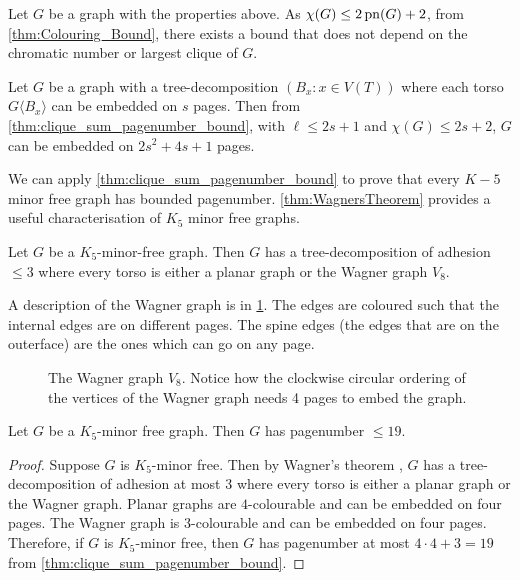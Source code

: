 Let $G$ be a graph with the properties above. As \(\chi(G) \leq 2 \pn(G) + 2\), from \cref{thm:Colouring_Bound}, there exists a bound that does not depend on the chromatic number or largest clique of \(G\).
\begin{corollary}\label{corr:bded_pn_tree_decomp}
	Let \(G\) be a graph with a tree-decomposition \((B_x: x \in V(T))\) where each torso \(G \langle B_x \rangle\) can be embedded on $s$ pages. Then from \cref{thm:clique_sum_pagenumber_bound}, with $\ell \leq 2s + 1$ and $\chi(G) \leq 2 s + 2$, \(G\) can be embedded on \(2s^2 + 4s + 1\) pages.
\end{corollary}

We can apply \cref{thm:clique_sum_pagenumber_bound} to prove that every $K-5$ minor free graph has bounded pagenumber. \cref{thm:WagnersTheorem} provides a useful characterisation of $K_5$ minor free graphs. 
\begin{theorem}\label{thm:WagnersTheorem}
	Let \(G\) be a \(K_5\)-minor-free graph. Then \(G\) has a tree-decomposition of adhesion $\leq 3$ where every torso is either a planar graph or the Wagner graph \(V_8\).
\end{theorem}
A description of the Wagner graph is in \cref{fig:wagner}. The edges are coloured such that the internal edges are on different pages. The spine edges (the edges that are on the outerface) are the ones which can go on any page.
\begin{figure}[h!]
	\centering
	\begin{tikzpicture}[thick,scale=2, every node/.style={scale=2}]
		
	\end{tikzpicture}
	\caption[Wagner graph]{The Wagner graph $V_8$. Notice how the clockwise circular ordering of the vertices of the Wagner graph needs 4 pages to embed the graph. }\label{fig:wagner}
\end{figure}

\begin{theorem}
	Let \(G\) be a \(K_5\)-minor free graph. Then \(G\) has pagenumber \(\leq 19\).
\end{theorem}

\begin{proof}
	Suppose \(G\) is \(K_5\)-minor free. Then by Wagner's theorem \cite{wagnerUeberEigenschaftEbenen1937}, \(G\) has a tree-decomposition of adhesion at most 3 where every torso is either a planar graph or the Wagner graph.
	Planar graphs are \(4\)-colourable and can be embedded on four pages. The Wagner graph is \(3\)-colourable and can be embedded on four pages. Therefore, if \(G\) is \(K_5\)-minor free, then \(G\) has pagenumber at most \(4 \cdot 4 + 3 = 19\) from \cref{thm:clique_sum_pagenumber_bound}.
\end{proof}
